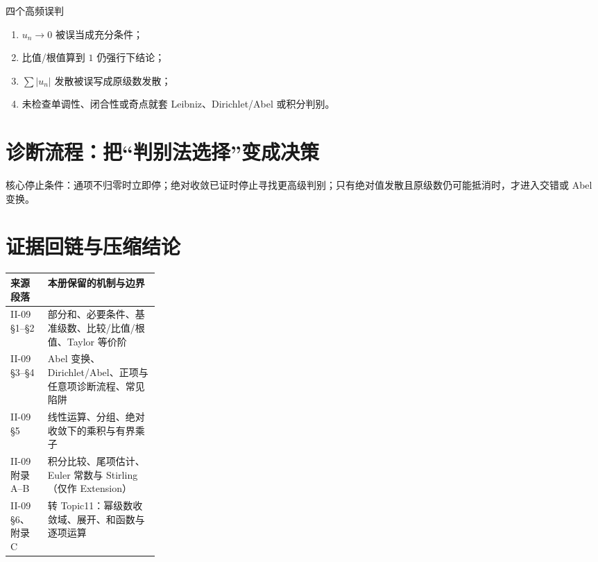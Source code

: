 \documentclass[11pt,a4paper,fontset=fandol]{ctexart}
\begin{document}
\begin{warnbox}{四个高频误判}
\begin{enumerate}
  \item $u_n\to0$ 被误当成充分条件；
  \item 比值/根值算到 $1$ 仍强行下结论；
  \item $\sum|u_n|$ 发散被误写成原级数发散；
  \item 未检查单调性、闭合性或奇点就套 Leibniz、Dirichlet/Abel 或积分判别。
\end{enumerate}
\end{warnbox}

\section{诊断流程：把“判别法选择”变成决策}
\begin{center}
\end{center}
核心停止条件：通项不归零时立即停；绝对收敛已证时停止寻找更高级判别；只有绝对值发散且原级数仍可能抵消时，才进入交错或 Abel 变换。

\section{证据回链与压缩结论}
\begin{tabularx}{\linewidth}{L{0.25\linewidth}Y}
\toprule
来源段落 & 本册保留的机制与边界 \\
\midrule
II-09 §1--§2 & 部分和、必要条件、基准级数、比较/比值/根值、Taylor 等价阶 \\
II-09 §3--§4 & Abel 变换、Dirichlet/Abel、正项与任意项诊断流程、常见陷阱 \\
II-09 §5 & 线性运算、分组、绝对收敛下的乘积与有界乘子 \\
II-09 附录 A--B & 积分比较、尾项估计、Euler 常数与 Stirling（仅作 Extension） \\
II-09 §6、附录 C & 转 Topic11：幂级数收敛域、展开、和函数与逐项运算 \\
\bottomrule
\end{tabularx}
\end{document}
